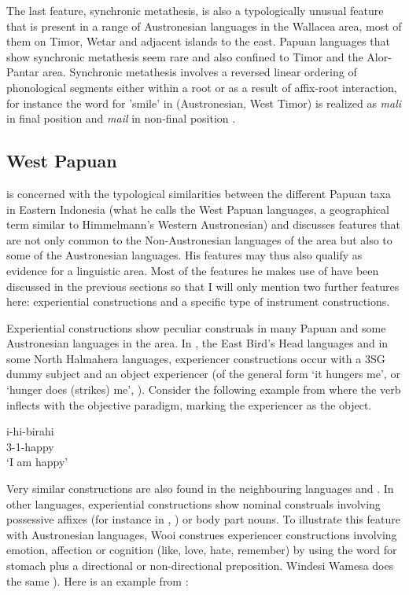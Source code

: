 The last feature, synchronic metathesis, is also a typologically unusual feature that is present in a range of Austronesian languages in the Wallacea area, most of them on Timor, Wetar and adjacent islands to the east. Papuan languages that show synchronic metathesis seem rare and also confined to Timor and the Alor-Pantar area. Synchronic metathesis involves a reversed linear ordering of phonological segments either within a root or as a result of affix-root interaction, for instance the word for 'smile' in  (Austronesian, West Timor) is realized as \textit{mali} in final position and \textit{mail} in non-final position \citep[134ff.]{schapper2015wallacea}.

\subsection{West Papuan}\label{sec:westpapuan}

\citet{reesink2005west} is concerned with the typological similarities between the different Papuan taxa in Eastern Indonesia (what he calls the West Papuan languages, a geographical term similar to Himmelmann's Western Austronesian) and discusses features that are not only common to the Non-Austronesian languages of the area but also to some of the Austronesian languages. His features may thus also qualify as evidence for a linguistic area. Most of the features he makes use of have been discussed in the previous sections so that I will only mention two further features here: experiential constructions and a specific type of instrument constructions. 

Experiential constructions show peculiar construals in many Papuan and some Austronesian languages in the area. In , the East Bird's Head languages and in some North Halmahera languages, experiencer constructions occur with a 3SG dummy subject and an object experiencer  (of the general form `it hungers me', or `hunger does (strikes) me', \citealt[191]{reesink2005west}). Consider the following example from  where the verb inflects with the objective paradigm, marking the experiencer as the object.

\ea 
\gll i-hi-birahi \\
3-1-happy \\
\glft `I am happy' \\ 
\endgl
\xe

Very similar constructions are also found in the neighbouring languages  and . In other languages, experiential constructions show nominal construals involving possessive affixes (for instance in , \citealt[192]{reesink2005west}) or body part nouns. To illustrate this feature with Austronesian languages, Wooi construes experiencer constructions involving emotion, affection or cognition (like, love, hate, remember) by using the word for stomach plus a directional or non-directional preposition. Windesi Wamesa does the same \citep[154]{gasser2014windesi}). Here is an example from :

